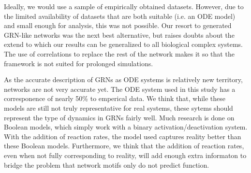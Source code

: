 \documentclass[../main.tex]{subfiles}
\begin{document}
Ideally, we would use a sample of empirically obtained datasets.
However, due to the limited availability of datasets that are both suitable (i.e. an ODE model) and small enough for analysis, this was not possible.
Our resort to generated GRN-like networks was the next best alternative, but raises doubts about the extend to which our results can be generalized to all biological complex systems.
The use of correlations to replace the rest of the network makes it so that the framework is not suited for prolonged simulations.

As the accurate description of GRNs as ODE systems is relatively new territory, networks are not very accurate yet.
The ODE system used in this study has a corresponence of nearly 50\% to emperical data.
We think that, while these models are still not truly representative for real systems, these sytems should represent the type of dynamics in GRNs fairly well.
Much research is done on Boolean models, which simply work with a binary activation/deactivation system.
With the addition of reaction rates, the model used captures reality better than these Boolean models.
Furthermore, we think that the addition of reaction rates, even when not fully corresponding to reality, will add enough extra informaton to bridge the problem that network motifs only do not predict function.
\end{document}
